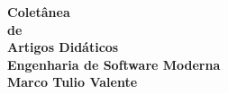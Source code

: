 \thispagestyle{empty}

\newpage
\thispagestyle{empty}
\vspace*{3cm}
\begin{center}
{\Huge \bf  Coletânea\\[.5cm] de\\[.5cm] Artigos Didáticos}\\ 
\vspace*{1cm}
{\Large \bf  Engenharia de Software Moderna}\\ 
\vspace*{3cm}
{\Large \bf Marco Tulio Valente}
\end{center}
\newpage

\newpage
\newpage

\tableofcontents
